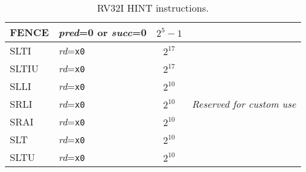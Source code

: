 \begin{table}[hbt]
\begin{tabular}{|l|l|c|l|}
  FENCE                 & {\em pred}=0 or {\em succ}=0                & $2^{5}-1$                   & \\ \hline \hline
  SLTI                  & {\em rd}={\tt x0}                           & $2^{17}$                    & \multirow{7}{*}{\em Reserved for custom use} \\ \cline{1-3}
  SLTIU                 & {\em rd}={\tt x0}                           & $2^{17}$                    & \\ \cline{1-3}
  SLLI                  & {\em rd}={\tt x0}                           & $2^{10}$                    & \\ \cline{1-3}
  SRLI                  & {\em rd}={\tt x0}                           & $2^{10}$                    & \\ \cline{1-3}
  SRAI                  & {\em rd}={\tt x0}                           & $2^{10}$                    & \\ \cline{1-3}
  SLT                   & {\em rd}={\tt x0}                           & $2^{10}$                    & \\ \cline{1-3}
  SLTU                  & {\em rd}={\tt x0}                           & $2^{10}$                    & \\ \hline
\end{tabular}
\caption{RV32I HINT instructions.}
\label{tab:rv32i-hints}
\end{table}

